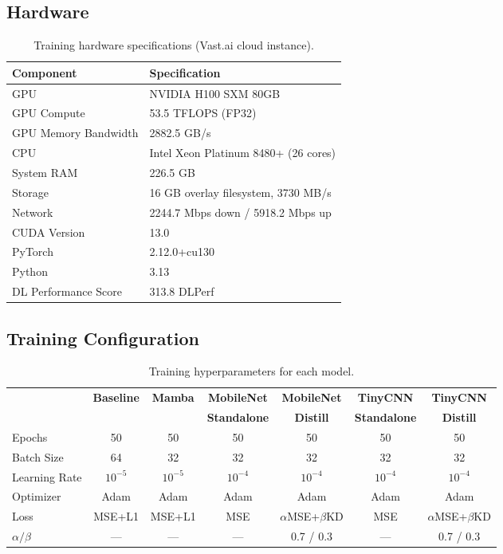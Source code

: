 \documentclass[11pt,a4paper]{article}
\begin{document}
\subsection{Hardware}

\begin{table}[H]
\centering
\caption{Training hardware specifications (Vast.ai cloud instance).}
\begin{tabular}{ll}
\toprule
\textbf{Component} & \textbf{Specification} \\
\midrule
GPU & NVIDIA H100 SXM 80GB \\
GPU Compute & 53.5 TFLOPS (FP32) \\
GPU Memory Bandwidth & 2882.5 GB/s \\
CPU & Intel Xeon Platinum 8480+ (26 cores) \\
System RAM & 226.5 GB \\
Storage & 16 GB overlay filesystem, 3730 MB/s \\
Network & 2244.7 Mbps down / 5918.2 Mbps up \\
CUDA Version & 13.0 \\
PyTorch & 2.12.0+cu130 \\
Python & 3.13 \\
DL Performance Score & 313.8 DLPerf \\
\bottomrule
\end{tabular}
\end{table}

\subsection{Training Configuration}

\begin{table}[H]
\centering
\caption{Training hyperparameters for each model.}
\begin{tabular}{lcccccc}
\toprule
 & \textbf{Baseline} & \textbf{Mamba} & \textbf{MobileNet} & \textbf{MobileNet} & \textbf{TinyCNN} & \textbf{TinyCNN} \\
 & & & \textbf{Standalone} & \textbf{Distill} & \textbf{Standalone} & \textbf{Distill} \\
\midrule
Epochs & 50 & 50 & 50 & 50 & 50 & 50 \\
Batch Size & 64 & 32 & 32 & 32 & 32 & 32 \\
Learning Rate & $10^{-5}$ & $10^{-5}$ & $10^{-4}$ & $10^{-4}$ & $10^{-4}$ & $10^{-4}$ \\
Optimizer & Adam & Adam & Adam & Adam & Adam & Adam \\
Loss & MSE+L1 & MSE+L1 & MSE & $\alpha$MSE+$\beta$KD & MSE & $\alpha$MSE+$\beta$KD \\
$\alpha / \beta$ & --- & --- & --- & 0.7 / 0.3 & --- & 0.7 / 0.3 \\
\bottomrule
\end{tabular}
\end{table}
\end{document}
